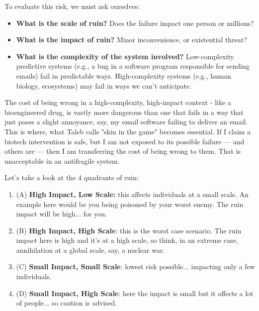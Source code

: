 To evaluate this risk, we must ask ourselves:

\begin{itemize}
	\item \textbf{What is the scale of ruin?} Does the failure impact one person or millions?
	\item \textbf{What is the impact of ruin?} Minor inconvenience, or existential threat?
	\item \textbf{What is the complexity of the system involved?} Low-complexity predictive systems (e.g., a bug in a software program responsible for sending emails) fail in predictable ways. High-complexity systems (e.g., human biology, ecosystems) may fail in ways we can’t anticipate.
\end{itemize}

The cost of being wrong in a high-complexity, high-impact context - like a bioengineered drug, is vastly more dangerous than one that fails in a way that just poses a slight annoyance, say, my email software failing to deliver an email. This is where, what Taleb calls "skin in the game" becomes essential. If I claim a biotech intervention is safe, but I am not exposed to its possible failure — and others are — then I am transferring the cost of being wrong to them. That is unacceptable in an antifragile system.

Let's take a look at the 4 quadrants of ruin:

\begin{center}
\end{center}

\begin{enumerate}
	\item (A) \textbf{High Impact, Low Scale:} this affects individuals at a small scale. An example here would be you being poisoned by your worst enemy. The ruin impact will be high... for you.
	\item (B) \textbf{High Impact, High Scale}: this is the worst case scenario. The ruin impact here is high and it's at a high scale, so think, in an extreme case, annihilation at a global scale, say, a nuclear war.
	\item (C) \textbf{Small Impact, Small Scale}: lowest risk possible... impacting only a few individuals.
	\item (D) \textbf{Small Impact, High Scale}: here the impact is small but it affects a lot of people... so caution is advised.
\end{enumerate}


